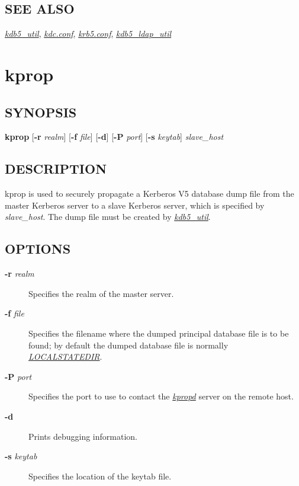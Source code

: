 \documentclass[letterpaper,10pt,english]{sphinxmanual}
\begin{document}
\subsection{SEE ALSO}
\label{admin/admin_commands/krb5kdc:see-also}
{\hyperref[admin/admin_commands/kdb5_util:kdb5-util-8]{\emph{kdb5\_util}}}, {\hyperref[admin/conf_files/kdc_conf:kdc-conf-5]{\emph{kdc.conf}}}, {\hyperref[admin/conf_files/krb5_conf:krb5-conf-5]{\emph{krb5.conf}}},
{\hyperref[admin/admin_commands/kdb5_ldap_util:kdb5-ldap-util-8]{\emph{kdb5\_ldap\_util}}}


\section{kprop}
\label{admin/admin_commands/kprop:kprop-8}\label{admin/admin_commands/kprop::doc}\label{admin/admin_commands/kprop:kprop}

\subsection{SYNOPSIS}
\label{admin/admin_commands/kprop:synopsis}
\textbf{kprop}
{[}\textbf{-r} \emph{realm}{]}
{[}\textbf{-f} \emph{file}{]}
{[}\textbf{-d}{]}
{[}\textbf{-P} \emph{port}{]}
{[}\textbf{-s} \emph{keytab}{]}
\emph{slave\_host}


\subsection{DESCRIPTION}
\label{admin/admin_commands/kprop:description}
kprop is used to securely propagate a Kerberos V5 database dump file
from the master Kerberos server to a slave Kerberos server, which is
specified by \emph{slave\_host}.  The dump file must be created by
{\hyperref[admin/admin_commands/kdb5_util:kdb5-util-8]{\emph{kdb5\_util}}}.


\subsection{OPTIONS}
\label{admin/admin_commands/kprop:options}\begin{description}
\item[{\textbf{-r} \emph{realm}}] \leavevmode
Specifies the realm of the master server.

\item[{\textbf{-f} \emph{file}}] \leavevmode
Specifies the filename where the dumped principal database file is
to be found; by default the dumped database file is normally
{\hyperref[mitK5defaults:paths]{\emph{LOCALSTATEDIR}}}.

\item[{\textbf{-P} \emph{port}}] \leavevmode
Specifies the port to use to contact the {\hyperref[admin/admin_commands/kpropd:kpropd-8]{\emph{kpropd}}} server
on the remote host.

\item[{\textbf{-d}}] \leavevmode
Prints debugging information.

\item[{\textbf{-s} \emph{keytab}}] \leavevmode
Specifies the location of the keytab file.

\end{description}
\end{document}
